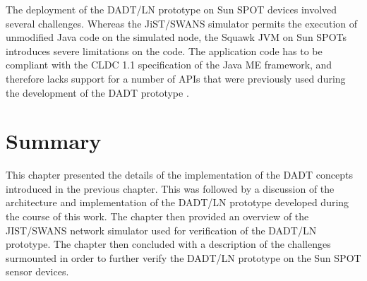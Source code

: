 The deployment of the DADT/LN prototype on Sun SPOT devices involved several
challenges. Whereas the JiST/SWANS simulator permits the execution of unmodified Java code
on the simulated node, the Squawk JVM on Sun SPOTs introduces severe limitations
on the code. The application code has to be compliant with the CLDC 1.1 specification
of the Java ME framework, and therefore lacks support for a number of APIs that were
previously used during the development of the DADT prototype \cite{migliavacca_DADT:2006}.

\section{Summary}

This chapter presented the details of the implementation of the DADT concepts
introduced in the previous chapter. This was followed by a discussion of the
architecture and implementation of the DADT/LN prototype developed during the
course of this work. The chapter then provided an overview of the JIST/SWANS
network simulator used for verification of the DADT/LN prototype. The chapter
then concluded with a description of the challenges surmounted in order to
further verify the DADT/LN prototype on the Sun SPOT sensor devices.
